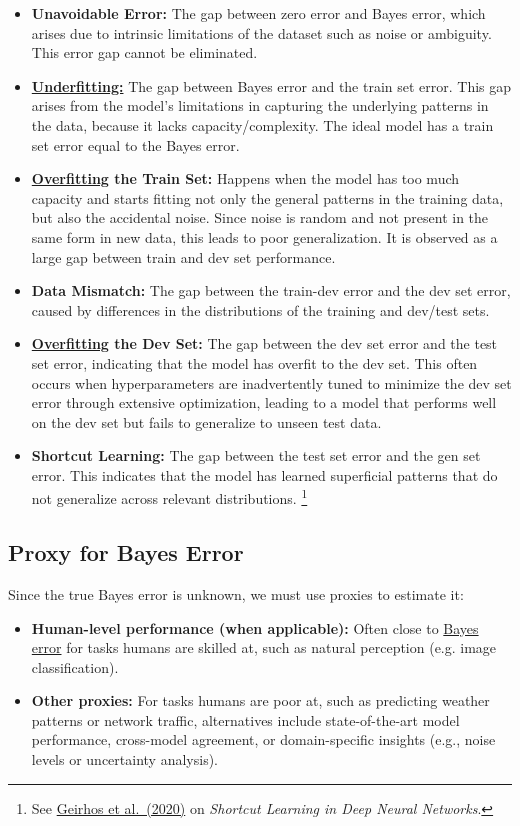 \documentclass[12pt,openany]{book}
\begin{document}
\begin{itemize}
    \item \textbf{Unavoidable Error:} The gap between zero error and Bayes error, which arises due to intrinsic limitations of the dataset such as noise or ambiguity. This error gap cannot be eliminated.
    \item \textbf{\hyperref[subsec:underfitting]{Underfitting:}} The gap between Bayes error and the train set error. This gap arises from the model's limitations in capturing the underlying patterns in the data, because it lacks capacity/complexity. The ideal model has a train set error equal to the Bayes error.
    \item \textbf{\hyperref[subsec:overfitting]{Overfitting} the Train Set:}
     Happens when the model has too much capacity and starts fitting not only the general patterns in the training data, but also the accidental noise. Since noise is random and not present in the same form in new data, this leads to poor generalization. It is observed as a large gap between train and dev set performance.
    \item \textbf{Data Mismatch:} The gap between the train-dev error and the dev set error, caused by differences in the distributions of the training and dev/test sets.
    \item \textbf{\hyperref[subsec:overfitting]{Overfitting} the Dev Set:}
     The gap between the dev set error and the test set error, indicating that the model has overfit to the dev set. This often occurs when hyperparameters are inadvertently tuned to minimize the dev set error through extensive optimization, leading to a model that performs well on the dev set but fails to generalize to unseen test data.
    \item \textbf{Shortcut Learning:} The gap between the test set error and the gen set error. This indicates that the model has learned superficial patterns that do not generalize across relevant distributions. \footnote{See \href{https://doi.org/10.1038/s42256-020-00257-z}{Geirhos et al.\ (2020)} on \textit{Shortcut Learning in Deep Neural Networks}.}
\end{itemize}


\subsection{Proxy for Bayes Error} \label{subsec:proxy-for-bayes-error}
Since the true Bayes error is unknown, we must use proxies to estimate it:
\begin{itemize}
    \item \textbf{Human-level performance (when applicable):} Often close to \hyperref[subsec:Bayes_error]{Bayes error} for tasks humans are skilled at, such as natural perception (e.g. image classification).
    \item \textbf{Other proxies:} For tasks humans are poor at, such as predicting weather patterns or network traffic, alternatives include state-of-the-art model performance, cross-model agreement, or domain-specific insights (e.g., noise levels or uncertainty analysis). 
\end{itemize} 
\end{document}
